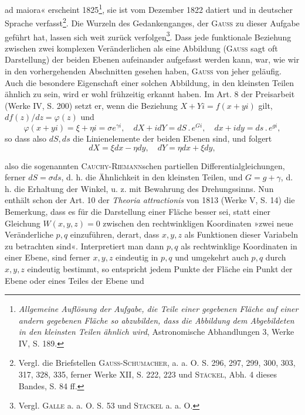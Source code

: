ad maiora« erscheint 1825\footnote{\textit{Allgemeine Auflösung der Aufgabe, die Teile einer gegebenen Fläche auf einer andern gegebenen Fläche so abzubilden, dass die Abbildung dem Abgebildeten in den kleinsten Teilen ähnlich wird}, Astronomische Abhandlungen 3, Werke IV, S. 189.}, sie ist vom Dezember 1822 datiert und
in deutscher Sprache verfasst\footnote{Vergl. die Briefstellen \textsc{Gauss-Schumacher}, a. a. O. S. 296, 297, 299, 300, 303, 317, 328, 335, ferner Werke XII, S. 222, 223 und \textsc{Stäckel}, Abh. 4 dieses Bandes, S. 84 ff.}. Die Wurzeln des Gedankenganges, der
\textsc{Gauss} zu dieser Aufgabe geführt hat, lassen sich weit zurück verfolgen\footnote{Vergl. \textsc{Galle} a. a. O. S. 53 und \textsc{Stäckel} a. a. O.}.
Dass jede funktionale Beziehung zwischen zwei komplexen Veränderlichen als
eine Abbildung (\textsc{Gauss} sagt oft Darstellung) der beiden Ebenen aufeinander
aufgefasst werden kann, war, wie wir in den vorhergehenden Abschnitten gesehen
haben, \textsc{Gauss} von jeher geläufig. Auch die besondere Eigenschaft einer
solchen Abbildung, in den kleinsten Teilen ähnlich zu sein, wird er wohl
frühzeitig erkannt haben. Im Art. 8 der Preisarbeit (Werke IV, S. 200) setzt
er, wenn die Beziehung \(X+Yi=f(x+yi)\) gilt, \(df(z)/dz=\varphi(z)\) und
\[
\varphi(x+yi)=\xi+\eta i=\sigma e^{\gamma i},\quad dX+idY=dS\mathbin{.}e^{Gi},\quad dx+idy=ds\mathbin{.}e^{gi},
\]
so dass also \(dS,ds\) die Linienelemente der beiden Ebenen sind, und folgert
\[
dX=\xi dx-\eta dy,\quad dY=\eta dx+\xi dy,
\]
\HistoricalFoot{}{22\textsuperscript{*}}
\par\clearpage{}
\noindent also die sogenannten \textsc{Cauchy-Riemann}schen partiellen Differentialgleichungen,
ferner \(dS=\sigma ds\), d. h. die Ähnlichkeit in den kleinsten Teilen, und \(G=g+\gamma\),
d. h. die Erhaltung der Winkel, u. z. mit Bewahrung des Drehungssinns. Nun
enthält schon der Art. 10 der \textit{Theoria attractionis} von 1813 (Werke V, S. 14)
die Bemerkung, dass es für die Darstellung einer Fläche besser sei, statt einer
Gleichung \(W(x,y,z)=0\) zwischen den rechtwinkligen Koordinaten »zwei
neue Veränderliche \(p,q\) einzuführen, derart, dass \(x,y,z\) als Funktionen dieser
Variabeln zu betrachten sind«. Interpretiert man dann \(p,q\) als rechtwinklige
Koordinaten in einer Ebene, sind ferner \(x,y,z\) eindeutig in \(p,q\) und
umgekehrt auch \(p,q\) durch \(x,y,z\) eindeutig bestimmt, so entspricht jedem
Punkte der Fläche ein Punkt der Ebene oder eines Teiles der Ebene und

